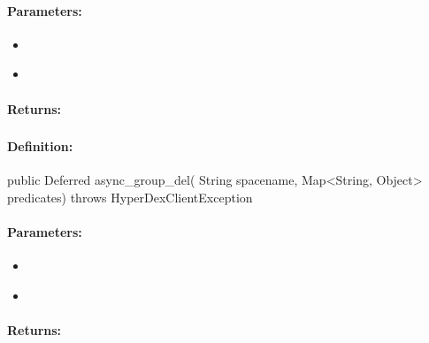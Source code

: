 \paragraph{Parameters:}
\begin{itemize}[noitemsep]
\item {}\\

\item {}\\

\end{itemize}

\paragraph{Returns:}


\pagebreak
\subsubsection{}
\label{api:java:async_group_del}


\paragraph{Definition:}
\begin{javacode}
public Deferred async_group_del(
        String spacename,
        Map<String, Object> predicates) throws HyperDexClientException
\end{javacode}

\paragraph{Parameters:}
\begin{itemize}[noitemsep]
\item {}\\

\item {}\\

\end{itemize}

\paragraph{Returns:}


